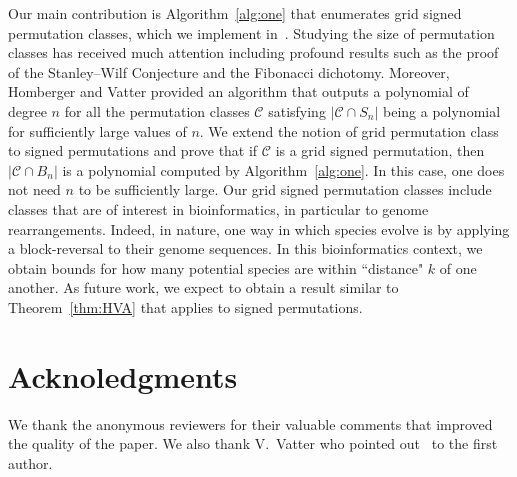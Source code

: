\documentclass{article}
\numberwithin{equation}{section}
\theoremstyle{definition}
\begin{document}
Our main contribution is Algorithm~\ref{alg:one} that enumerates grid signed permutation classes, which we implement in~\cite{S22}. Studying the size of permutation classes has received much attention including profound results such as the proof of the Stanley--Wilf Conjecture and the Fibonacci dichotomy. Moreover, Homberger and Vatter provided an algorithm that outputs a polynomial of degree $n$ for all the permutation classes $\mathcal{C}$ satisfying $|\mathcal{C}\cap S_n|$ being a polynomial for sufficiently large values of $n$. We extend the notion of grid permutation class to signed permutations and prove that if $\mathcal{C}$ is a grid signed permutation, then $|\mathcal{C}\cap B_n|$ is a polynomial computed by Algorithm~\ref{alg:one}. In this case, one does not need $n$ to be sufficiently large. Our grid signed permutation classes include classes that are of interest in bioinformatics, in particular to genome rearrangements.  Indeed, in nature, one way in which species evolve is by applying a block-reversal to their genome sequences. In this bioinformatics context, we obtain bounds for how many potential species are within ``distance" $k$ of one another. As future work, we expect to obtain a result similar to Theorem~\ref{thm:HVA} that applies to signed permutations.

\section*{Acknoledgments}
We thank the anonymous reviewers for their valuable comments that improved the quality of the paper. We also thank V.~Vatter who pointed out~\cite{HV16} to the first author. 


\end{document}
